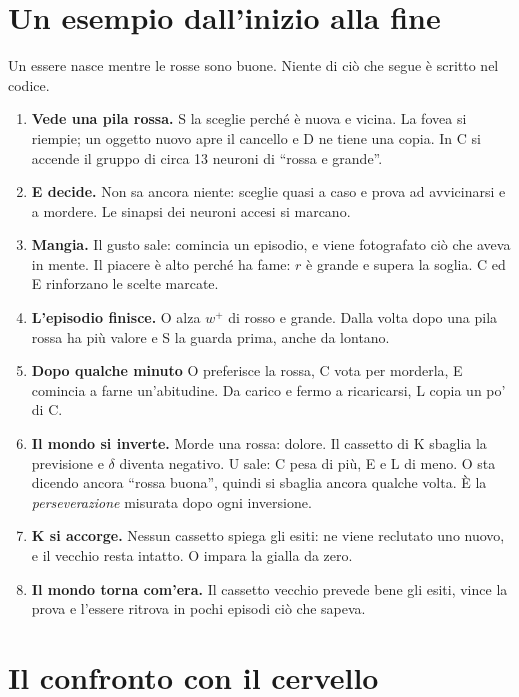 \documentclass[11pt,a4paper]{article}
\begin{document}
\section{Un esempio dall'inizio alla fine}

Un essere nasce mentre le rosse sono buone. Niente di ciò che segue è scritto nel codice.

\begin{enumerate}
\item \textbf{Vede una pila rossa.} S la sceglie perché è nuova e vicina. La fovea si
  riempie; un oggetto nuovo apre il cancello e D ne tiene una copia. In C si accende il
  gruppo di circa 13 neuroni di ``rossa e grande''.
\item \textbf{E decide.} Non sa ancora niente: sceglie quasi a caso e prova ad avvicinarsi
  e a mordere. Le sinapsi dei neuroni accesi si marcano.
\item \textbf{Mangia.} Il gusto sale: comincia un episodio, e viene fotografato ciò che
  aveva in mente. Il piacere è alto perché ha fame: $r$ è grande e supera la soglia.
  C ed E rinforzano le scelte marcate.
\item \textbf{L'episodio finisce.} O alza $w^+$ di rosso e grande. Dalla volta dopo
  una pila rossa ha più valore e S la guarda prima, anche da lontano.
\item \textbf{Dopo qualche minuto} O preferisce la rossa, C vota per morderla, E comincia
  a farne un'abitudine. Da carico e fermo a ricaricarsi, L copia un po' di C.
\item \textbf{Il mondo si inverte.} Morde una rossa: dolore. Il cassetto di K sbaglia
  la previsione e $\delta$ diventa negativo. U sale: C pesa di più, E e L di meno. O sta dicendo ancora
  ``rossa buona'', quindi si sbaglia ancora qualche volta. È la \emph{perseverazione}
  misurata dopo ogni inversione.
\item \textbf{K si accorge.} Nessun cassetto spiega gli esiti: ne viene reclutato uno
  nuovo, e il vecchio resta intatto. O impara la gialla da zero.
\item \textbf{Il mondo torna com'era.} Il cassetto vecchio prevede bene gli esiti, vince
  la prova e l'essere ritrova in pochi episodi ciò che sapeva.
\end{enumerate}

\section{Il confronto con il cervello}
\end{document}
